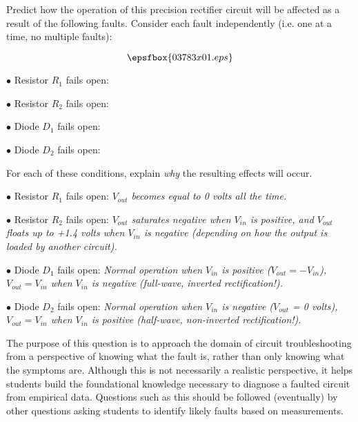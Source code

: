 

Predict how the operation of this precision rectifier circuit will be affected as a result of the following faults.  Consider each fault independently (i.e. one at a time, no multiple faults):

$$\epsfbox{03783x01.eps}$$

\medskip
\item{$\bullet$} Resistor $R_1$ fails open:
\vskip 5pt
\item{$\bullet$} Resistor $R_2$ fails open:
\vskip 5pt
\item{$\bullet$} Diode $D_1$ fails open:
\vskip 5pt
\item{$\bullet$} Diode $D_2$ fails open:
\medskip

For each of these conditions, explain {\it why} the resulting effects will occur.







\medskip
\item{$\bullet$} Resistor $R_1$ fails open: {\it $V_{out}$ becomes equal to 0 volts all the time.}
\vskip 5pt
\item{$\bullet$} Resistor $R_2$ fails open: {\it $V_{out}$ saturates negative when $V_{in}$ is positive, and $V_{out}$ floats up to +1.4 volts when $V_{in}$ is negative (depending on how the output is loaded by another circuit).}
\vskip 5pt
\item{$\bullet$} Diode $D_1$ fails open: {\it Normal operation when $V_{in}$ is positive ($V_{out} = - V_{in}$), $V_{out} = V_{in}$ when $V_{in}$ is negative (full-wave, inverted rectification!).}
\vskip 5pt
\item{$\bullet$} Diode $D_2$ fails open: {\it Normal operation when $V_{in}$ is negative ($V_{out}$ = 0 volts), $V_{out} = V_{in}$ when $V_{in}$ is positive (half-wave, non-inverted rectification!).}
\medskip







The purpose of this question is to approach the domain of circuit troubleshooting from a perspective of knowing what the fault is, rather than only knowing what the symptoms are.  Although this is not necessarily a realistic perspective, it helps students build the foundational knowledge necessary to diagnose a faulted circuit from empirical data.  Questions such as this should be followed (eventually) by other questions asking students to identify likely faults based on measurements.




